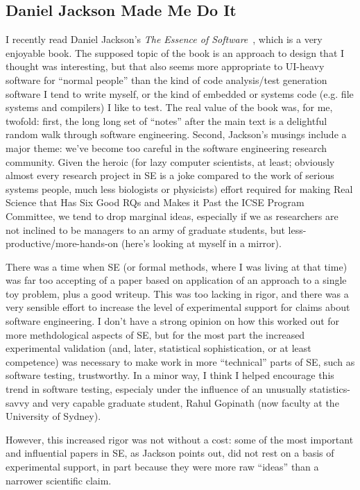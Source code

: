 \documentclass[sigplan,screen]{acmart}
\begin{document}
\subsection{Daniel Jackson Made Me Do It}

I recently read Daniel Jackson's \emph{The Essence of Software}~\cite{essence}, which
is a very enjoyable book.  The supposed topic of the book is an
approach to design that I thought was interesting, but that also seems
more appropriate to UI-heavy software for ``normal people'' than the
kind of code analysis/test generation software I tend to write
myself, or the kind of embedded or systems code (e.g. file systems and
compilers) I
like to test.  The real value of the book was, for me, twofold:  first, the
long long set of ``notes'' after the main text is a delightful random
walk through software engineering.  Second, Jackson's musings include
a major theme:  we've become too careful in the software engineering
research community.  Given the heroic (for lazy computer scientists,
at least;
obviously almost every research project in SE is a joke compared to
the work of serious systems people, much less biologists or
physicists) effort required for making Real Science that Has Six Good
RQs and Makes it Past the ICSE Program Committee, we tend to drop
marginal ideas, especially if we as researchers are not inclined to be
managers to an army of graduate students, but
less-productive/more-hands-on (here's looking at myself in a mirror).

There was a time
when SE (or formal methods, where I was living at that time) was far
too accepting of a paper based on application of an approach to a
single toy problem, plus a good writeup.  This was too lacking in
rigor, and there was a very sensible effort to increase the level of
experimental support for claims about software engineering.  I don't
have a strong opinion on how this worked out for more methdological
aspects of SE, but for the most part the increased experimental
validation (and, later, statistical sophistication, or at least competence) was necessary to
make work in more ``technical'' parts of SE, such as software testing,
trustworthy.  In a minor way, I think I helped encourage this trend in
software testing, especialy under the influence of an unusually
statistics-savvy and very capable graduate student, Rahul Gopinath
(now faculty at the University of Sydney).

However, this increased rigor was not without a cost:  some of the most important and
influential papers in SE, as Jackson points out, did not rest on a
basis of experimental support, in part because they were more raw
``ideas'' than a narrower scientific claim.
\end{document}
